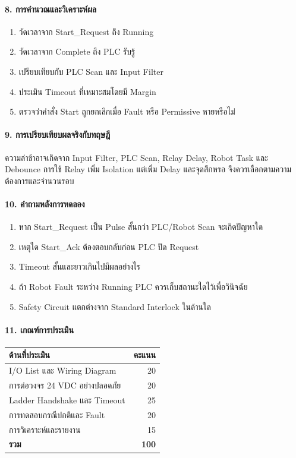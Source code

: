\paragraph{8. การคำนวณและวิเคราะห์ผล}

\begin{enumerate}
    \item วัดเวลาจาก Start\_Request ถึง Running
    \item วัดเวลาจาก Complete ถึง PLC รับรู้
    \item เปรียบเทียบกับ PLC Scan และ Input Filter
    \item ประเมิน Timeout ที่เหมาะสมโดยมี Margin
    \item ตรวจว่าคำสั่ง Start ถูกยกเลิกเมื่อ Fault หรือ Permissive หายหรือไม่
\end{enumerate}

\paragraph{9. การเปรียบเทียบผลจริงกับทฤษฎี}

ความล่าช้าอาจเกิดจาก Input Filter, PLC Scan, Relay Delay, Robot Task และ Debounce การใช้ Relay เพิ่ม Isolation แต่เพิ่ม Delay และจุดสึกหรอ จึงควรเลือกตามความต้องการและจำนวนรอบ

\paragraph{10. คำถามหลังการทดลอง}

\begin{enumerate}
    \item หาก Start\_Request เป็น Pulse สั้นกว่า PLC/Robot Scan จะเกิดปัญหาใด
    \item เหตุใด Start\_Ack ต้องตอบกลับก่อน PLC ปิด Request
    \item Timeout สั้นและยาวเกินไปมีผลอย่างไร
    \item ถ้า Robot Fault ระหว่าง Running PLC ควรเก็บสถานะใดไว้เพื่อวินิจฉัย
    \item Safety Circuit แตกต่างจาก Standard Interlock ในด้านใด
\end{enumerate}

\paragraph{11. เกณฑ์การประเมิน}

\begin{table}[htbp]
    \centering
    \begin{tabular}{l r}
        \hline
        \textbf{ด้านที่ประเมิน} & \textbf{คะแนน} \\
        \hline
        I/O List และ Wiring Diagram & 20 \\
        การต่อวงจร 24 VDC อย่างปลอดภัย & 20 \\
        Ladder Handshake และ Timeout & 25 \\
        การทดสอบกรณีปกติและ Fault & 20 \\
        การวิเคราะห์และรายงาน & 15 \\
        \textbf{รวม} & \textbf{100} \\
        \hline
    \end{tabular}
\end{table}

